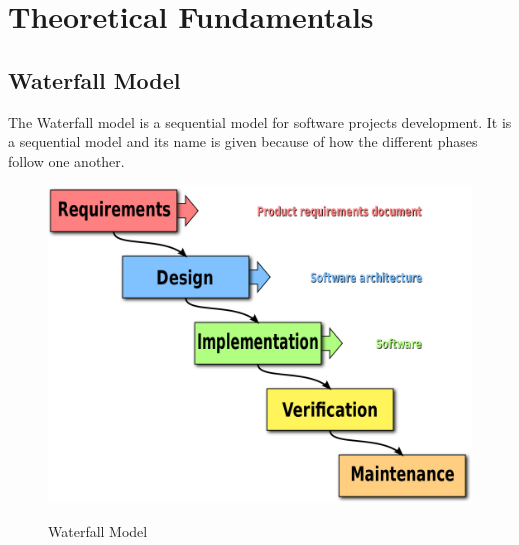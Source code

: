 

\section{Theoretical Fundamentals}
\subsection{Waterfall Model}
The Waterfall model is a sequential model for software projects development. It is a sequential model and its name is given because of how the different phases follow one another.

\begin{figure}[!h]
	\center
	\label{figure3}
	\includegraphics[scale=0.30]{Figures/waterfall} \\
	\caption {Waterfall Model}
\end{figure}

